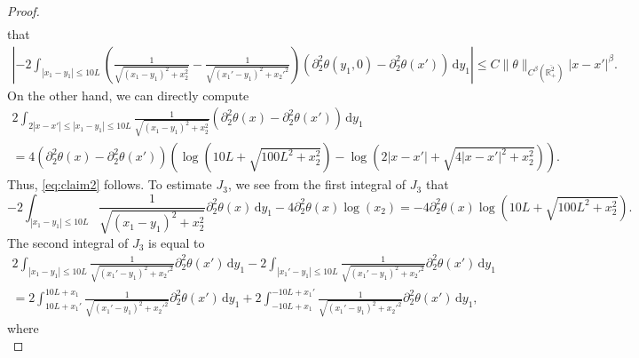 \documentclass[10pt]{amsart}
\theoremstyle{definition}
\theoremstyle{remark}
\numberwithin{equation}{section}
\newcommand{\ud}{\mathrm{d}}
\newcommand{\rd}{\partial}
\newcommand{\0}{\emptyset}
\newcommand{\ohp}{\overline{\bbR^2_+}}
\newcommand{\tht}{\theta}
\newcommand{\bbR}{\mathbb R}
\begin{document}
\begin{proof}
\begin{equation*}
\begin{gathered}
			\end{gathered}
		\end{equation*} that \begin{equation*}
			\begin{gathered}
				\left| -2 \int_{|x_1-y_1| \le 10L } \left( \frac{1}{ \sqrt{ (x_1-y_1)^2 + x_2^2 }  } - \frac{1}{ \sqrt{ (x_1'-y_1)^2 + x_2'^2 }  } \right) (\rd_{2}^2 \tht(y_1,0) - \rd_{2}^2 \tht(x')) \, \ud y_1 \right| \leq C \| \tht \|_{C^{\beta}(\ohp)} |x-x'|^{\beta}.
			\end{gathered}
		\end{equation*} On the other hand, we can directly compute \begin{equation*}
			\begin{gathered}
				2 \int_{2|x-x'| \leq |x_1-y_1| \leq 10L} \frac{1}{ \sqrt{ (x_1-y_1)^2 + x_2^2 }  } (\rd_{2}^2 \tht(x) - \rd_{2}^2 \tht(x')) \, \ud y_1 \\
				= 4 (\rd_{2}^2 \tht(x) - \rd_{2}^2 \tht(x')) \left( \log ( 10L + \sqrt{100L^2 + x_2^2} ) - \log (2|x-x'| + \sqrt{4|x-x'|^2 + x_2^2}) \right).
			\end{gathered}
		\end{equation*} Thus, \eqref{eq:claim2} follows. To estimate $J_3$, we see from the first integral of $J_3$ that \begin{equation}\label{eq:log_sing}
			-2 \int_{|x_1-y_1| \le 10L } \frac{1}{ \sqrt{ (x_1-y_1)^2 + x_2^2 }  } \rd_{2}^2 \tht(x) \, \ud y_1 - 4 \rd_{2}^2 \tht(x) \log (x_2) = -4 \rd_{2}^2 \tht(x) \log (10L + \sqrt{100L^2 + x_2^2}).
		\end{equation} The second integral of $J_3$ is equal to \begin{equation*}
			\begin{gathered}
				2 \int_{|x_1-y_1| \le 10L } \frac{1}{ \sqrt{ (x_1'-y_1)^2 + x_2'^2 }  } \rd_{2}^2 \tht(x') \, \ud y_1 - 2 \int_{|x_1'-y_1| \le 10L } \frac{1}{ \sqrt{ (x_1'-y_1)^2 + x_2'^2 }  } \rd_{2}^2 \tht(x') \, \ud y_1 \\
				= 2 \int_{10L + x_1'}^{10L + x_1} \frac{1}{ \sqrt{ (x_1'-y_1)^2 + x_2'^2 }  } \rd_{2}^2 \tht(x') \, \ud y_1 + 2 \int_{-10L + x_1}^{-10L + x_1'} \frac{1}{ \sqrt{ (x_1'-y_1)^2 + x_2'^2 }  } \rd_{2}^2 \tht(x') \, \ud y_1, 
			\end{gathered}
		\end{equation*} where \begin{equation*}

\end{equation*}
\end{proof}
\end{document}
